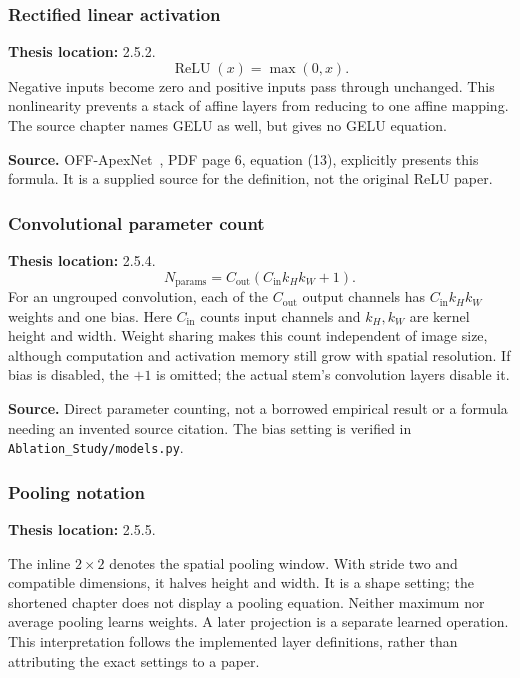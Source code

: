 \documentclass[11pt,a4paper]{article}
\numberwithin{equation}{section}
\begin{document}
\subsubsection{Rectified linear activation}
\label{fg:relu}
\textbf{Thesis location:} 2.5.2.
\begin{equation}
    \operatorname{ReLU}(x)=\max(0,x).
    \label{fg:eq:relu}
\end{equation}
Negative inputs become zero and positive inputs pass through unchanged. This
nonlinearity prevents a stack of affine layers from reducing to one affine
mapping. The source chapter names GELU as well, but gives no GELU equation.

\textbf{Source.} OFF-ApexNet~\cite{liong2019a}, PDF page 6, equation (13),
explicitly presents this formula. It is a supplied source for the definition,
not the original ReLU paper.

\subsubsection{Convolutional parameter count}
\label{fg:convparams}
\textbf{Thesis location:} 2.5.4.
\begin{equation}
    N_{\mathrm{params}}=C_{\mathrm{out}}
       (C_{\mathrm{in}}k_Hk_W+1).
    \label{fg:eq:convparams}
\end{equation}
For an ungrouped convolution, each of the $C_{\mathrm{out}}$ output channels has $C_{\mathrm{in}}k_Hk_W$
weights and one bias. Here $C_{\mathrm{in}}$ counts input channels and
$k_H,k_W$ are kernel height and width. Weight sharing makes this count
independent of image size, although computation and activation memory still
grow with spatial resolution. If bias is disabled, the $+1$ is omitted; the
actual stem's convolution layers disable it.

\textbf{Source.} Direct parameter counting, not a borrowed empirical result
or a formula needing an invented source citation. The bias setting is verified
in \texttt{Ablation\_Study/models.py}.

\subsubsection{Pooling notation}
\label{fg:pool}
\textbf{Thesis location:} 2.5.5.

The inline $2\times2$ denotes the spatial pooling window. With stride two and
compatible dimensions, it halves height and width. It is a shape setting;
the shortened chapter does not display a pooling equation. Neither maximum
nor average pooling learns weights. A later projection is a separate learned
operation. This interpretation follows the implemented layer definitions,
rather than attributing the exact settings to a paper.
\end{document}
